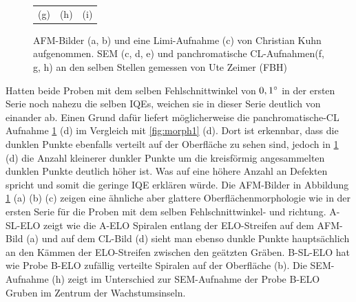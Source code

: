 \begin{figure}[htb]
\begin{tabular}{ccc}
(g)  & (h) & (i)   \\[6pt]
\end{tabular}
\caption{AFM-Bilder (a, b) und eine Limi-Aufnahme (c) von Christian Kuhn aufgenommen. SEM (c, d, e) und panchromatische CL-Aufnahmen(f, g, h) an den selben Stellen gemessen von Ute Zeimer (FBH)}
\label{fig:morph2}
\end{figure}
\noindent 
Hatten beide Proben mit dem selben Fehlschnittwinkel von $0,1 \degree$ in der ersten Serie noch nahezu die selben IQEs, weichen sie in dieser Serie deutlich von einander ab. Einen Grund dafür liefert möglicherweise die panchromatische-CL Aufnahme \ref{fig:morph2} (d) im Vergleich mit \ref{fig:morph1} (d). Dort ist erkennbar, dass die dunklen Punkte ebenfalls verteilt auf der Oberfläche zu sehen sind, jedoch in \ref{fig:morph2} (d) die Anzahl kleinerer dunkler Punkte um die kreisförmig angesammelten dunklen Punkte deutlich höher ist. Was auf eine höhere Anzahl an Defekten spricht und somit die geringe IQE erklären würde. Die AFM-Bilder in Abbildung \ref{fig:morph2} (a) (b) (c) zeigen eine ähnliche aber glattere Oberflächenmorphologie wie in der ersten Serie für die Proben mit dem selben Fehlschnittwinkel- und richtung. A-SL-ELO zeigt wie die A-ELO Spiralen entlang der ELO-Streifen auf dem AFM-Bild (a) und auf dem CL-Bild (d) sieht man ebenso dunkle Punkte hauptsächlich an den Kämmen der ELO-Streifen zwischen den geätzten Gräben. B-SL-ELO hat wie Probe B-ELO zufällig verteilte Spiralen auf der Oberfläche (b). Die SEM-Aufnahme (h) zeigt im Unterschied zur SEM-Aufnahme der Probe B-ELO Gruben im Zentrum der Wachstumsinseln. 
